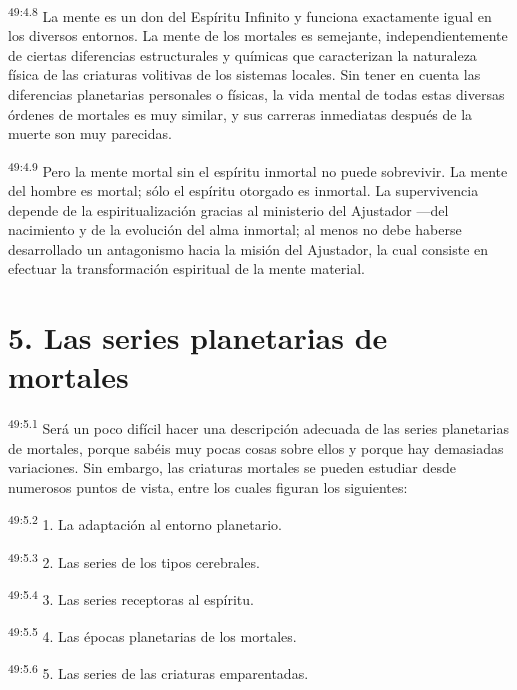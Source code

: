 \par
\textsuperscript{49:4.8} La mente es un don del Espíritu Infinito y funciona exactamente igual en los diversos entornos. La mente de los mortales es semejante, independientemente de ciertas diferencias estructurales y químicas que caracterizan la naturaleza física de las criaturas volitivas de los sistemas locales. Sin tener en cuenta las diferencias planetarias personales o físicas, la vida mental de todas estas diversas órdenes de mortales es muy similar, y sus carreras inmediatas después de la muerte son muy parecidas.

\par
\textsuperscript{49:4.9} Pero la mente mortal sin el espíritu inmortal no puede sobrevivir. La mente del hombre es mortal; sólo el espíritu otorgado es inmortal. La supervivencia depende de la espiritualización gracias al ministerio del Ajustador ---del nacimiento y de la evolución del alma inmortal; al menos no debe haberse desarrollado un antagonismo hacia la misión del Ajustador, la cual consiste en efectuar la transformación espiritual de la mente material.

\section*{5. Las series planetarias de mortales}
\par
\textsuperscript{49:5.1} Será un poco difícil hacer una descripción adecuada de las series planetarias de mortales, porque sabéis muy pocas cosas sobre ellos y porque hay demasiadas variaciones. Sin embargo, las criaturas mortales se pueden estudiar desde numerosos puntos de vista, entre los cuales figuran los siguientes:

\par
\textsuperscript{49:5.2} 1. La adaptación al entorno planetario.

\par
\textsuperscript{49:5.3} 2. Las series de los tipos cerebrales.

\par
\textsuperscript{49:5.4} 3. Las series receptoras al espíritu.

\par
\textsuperscript{49:5.5} 4. Las épocas planetarias de los mortales.

\par
\textsuperscript{49:5.6} 5. Las series de las criaturas emparentadas.

